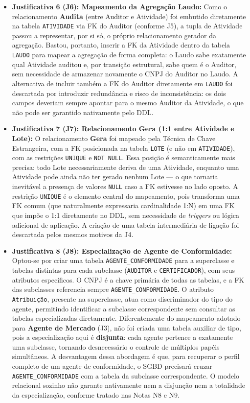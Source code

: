 \documentclass[12pt]{article}
\begin{document}
\begin{itemize}
    \item \textbf{Justificativa 6 (J6): Mapeamento da Agregação Laudo:}
    Como o relacionamento \textbf{Audita} (entre Auditor e Atividade) foi embutido diretamente na tabela \texttt{ATIVIDADE} via FK do Auditor (conforme J5), a tupla de Atividade passou a representar, por si só, o próprio relacionamento gerador da agregação. Bastou, portanto, inserir a FK da Atividade dentro da tabela \texttt{LAUDO} para mapear a agregação de forma completa: o Laudo sabe exatamente qual Atividade auditou e, por transição estrutural, sabe quem é o Auditor, sem necessidade de armazenar novamente o CNPJ do Auditor no Laudo. A alternativa de incluir também a FK do Auditor diretamente em \texttt{LAUDO} foi descartada por introduzir redundância e risco de inconsistência: os dois campos deveriam sempre apontar para o mesmo Auditor da Atividade, o que não pode ser garantido nativamente pelo DDL.
 
    \item \textbf{Justificativa 7 (J7): Relacionamento Gera (1:1 entre Atividade e Lote):}
    O relacionamento \textbf{Gera} foi mapeado pela Técnica de Chave Estrangeira, com a FK posicionada na tabela \texttt{LOTE} (e não em \texttt{ATIVIDADE}), com as restrições \texttt{UNIQUE} e \texttt{NOT NULL}. Essa posição é semanticamente mais precisa: todo Lote necessariamente deriva de uma Atividade, enquanto uma Atividade pode ainda não ter gerado nenhum Lote — o que tornaria inevitável a presença de valores \texttt{NULL} caso a FK estivesse no lado oposto. A restrição \texttt{UNIQUE} é o elemento central do mapeamento, pois transforma uma FK comum (que naturalmente expressaria cardinalidade 1:N) em uma FK que impõe o 1:1 diretamente no DDL, sem necessidade de \textit{triggers} ou lógica adicional de aplicação. A criação de uma tabela intermediária de ligação foi descartada pelos mesmos motivos da J4.
 
    \item \textbf{Justificativa 8 (J8): Especialização de Agente de Conformidade:}
    Optou-se por criar uma tabela \texttt{AGENTE\_CONFORMIDADE} para a superclasse e tabelas distintas para cada subclasse (\texttt{AUDITOR} e \texttt{CERTIFICADOR}), com seus atributos específicos. O CNPJ é a chave primária de todas as tabelas, e a FK das subclasses referencia sempre \texttt{AGENTE\_CONFORMIDADE}. O atributo \texttt{Atribuição}, presente na superclasse, atua como discriminador do tipo do agente, permitindo identificar a subclasse correspondente sem consultar as tabelas especializadas diretamente. Diferentemente do mapeamento adotado para \textbf{Agente de Mercado} (J3), não foi criada uma tabela auxiliar de tipo, pois a especialização aqui é \textbf{disjunta}: cada agente pertence a exatamente uma subclasse, tornando desnecessário o controle de múltiplos papéis simultâneos. A desvantagem dessa abordagem é que, para recuperar o perfil completo de um agente de conformidade, o SGBD precisará cruzar \texttt{AGENTE\_CONFORMIDADE} com a tabela da subclasse correspondente. O modelo relacional sozinho não garante nativamente nem a disjunção nem a totalidade da especialização, conforme tratado nas Notas N8 e N9.
 

\end{itemize}
\end{document}
